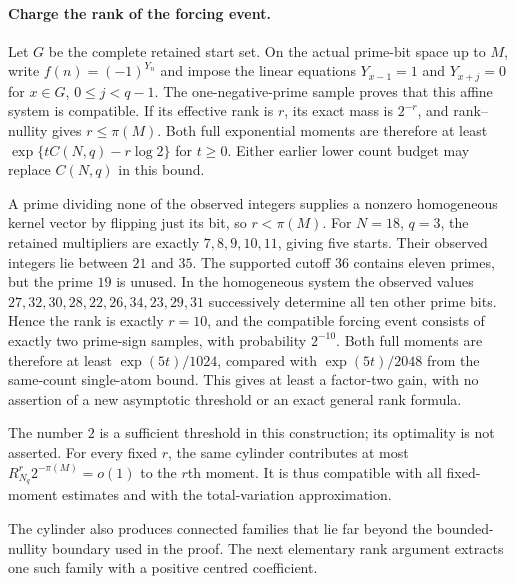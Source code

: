 \paragraph{Charge the rank of the forcing event.}
Let $G$ be the complete retained start set.  On the actual prime-bit
space up to $M$, write $f(n)=(-1)^{Y_n}$ and impose the linear equations
$Y_{x-1}=1$ and $Y_{x+j}=0$ for $x\in G$, $0\leq j<q-1$.
The one-negative-prime sample proves that this affine system is
compatible.  If its effective rank is $r$, its exact mass is $2^{-r}$,
and rank--nullity gives $r\leq\pi(M)$.  Both full exponential moments
are therefore at least $\exp\{tC(N,q)-r\log2\}$ for $t\geq0$.
Either earlier lower count budget may replace $C(N,q)$ in this bound.

A prime dividing none of the observed integers supplies a nonzero
homogeneous kernel vector by flipping just its bit, so $r<\pi(M)$.
For $N=18$, $q=3$, the retained multipliers are exactly $7,8,9,10,11$,
giving five starts.  Their observed integers lie between $21$ and $35$.
The supported cutoff $36$ contains eleven primes, but the prime $19$
is unused. In the homogeneous system the observed values
$27,32,30,28,22,26,34,23,29,31$ successively determine all ten other
prime bits. Hence the rank is exactly $r=10$, and the compatible
forcing event consists of exactly two prime-sign samples, with
probability $2^{-10}$. Both full moments are therefore at least
$\exp(5t)/1024$, compared with $\exp(5t)/2048$ from the same-count
single-atom bound.  This gives at least a factor-two gain, with no
assertion of a new asymptotic threshold or an exact general rank formula.

The number $2$ is a sufficient threshold in this construction;
its optimality is not asserted.  For every fixed $r$, the same
cylinder contributes at most $R_{N_q}^r2^{-\pi(M)}=o(1)$ to
the $r$th moment.  It is thus compatible with all fixed-moment
estimates and with the total-variation approximation.

The cylinder also produces connected families that lie far beyond
the bounded-nullity boundary used in the proof.  The next elementary
rank argument extracts one such family with a positive centred
coefficient.

